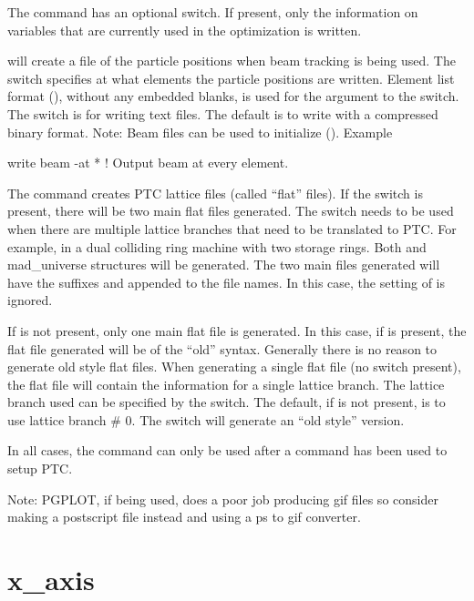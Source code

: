 {{{{{{The  command has an optional  switch.  If present,
only the information on variables that are currently used in the optimization is written.

 will create a file of the particle positions when beam tracking is being
used. The  switch specifies at what elements the particle positions are
written. Element list format (), without any embedded blanks, is
used for the  argument to the  switch. The  switch
is for writing text files. The default is to write with a compressed binary format.  Note:
Beam files can be used to initialize \tao (). Example
\begin{example}
  write beam -at *   ! Output beam at every element.
\end{example}

The  command creates PTC lattice files (called ``flat'' files).  If the
 switch is present, there will be two main flat files generated. The 
switch needs to be used when there are multiple lattice branches that need to be
translated to PTC. For example, in a dual colliding ring machine with two storage rings.
Both  and  mad_universe structures will be generated. The two main files
generated will have the suffixes  and  appended to the file names. In
this case, the setting of  is ignored.

If  is not present, only one main flat file is generated. In this case, if
 is present, the flat file generated will be of the ``old'' syntax. Generally
there is no reason to generate old style flat files. When generating a single flat file
(no  switch present), the flat file will contain the information for a single
lattice branch. The lattice branch used can be specified by the  switch. The
default, if  is not present, is to use lattice branch \# 0. The 
switch will generate an ``old style'' version.

In all cases, the  command can only be used after a  command
has been used to setup PTC.

Note: PGPLOT, if being used, does a poor job producing gif files so consider making a
postscript file instead and using a ps to gif converter.

\section{x_axis}
\label{s:x.axis}

}}}}}}
